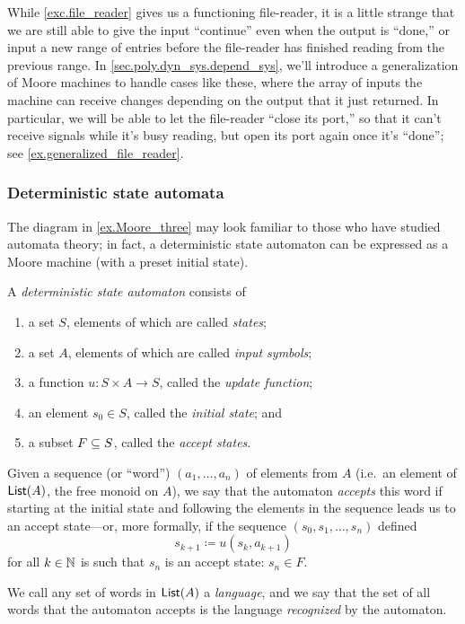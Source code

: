 \documentclass[Book-Poly]{subfiles}
\begin{document}
While \cref{exc.file_reader} gives us a functioning file-reader, it is a little strange that we are still able to give the input ``continue'' even when the output is ``done,'' or input a new range of entries before the file-reader has finished reading from the previous range.
In \cref{sec.poly.dyn_sys.depend_sys}, we'll introduce a generalization of Moore machines to handle cases like these, where the array of inputs the machine can receive changes depending on the output that it just returned.
In particular, we will be able to let the file-reader ``close its port,'' so that it can't receive signals while it's busy reading, but open its port again once it's ``done''; see \cref{ex.generalized_file_reader}.

\subsubsection{Deterministic state automata}


The diagram in \cref{ex.Moore_three} may look familiar to those who have studied automata theory; in fact, a deterministic state automaton can be expressed as a Moore machine (with a preset initial state).

\begin{definition}\label{def.dfa}
A \emph{deterministic state automaton} consists of
\begin{enumerate}
	\item a set $S$, elements of which are called \emph{states};
	\item a set $A$, elements of which are called \emph{input symbols};
	\item a function $u\colon S\times A\to S$, called the \emph{update function};
	\item an element $s_0\in S$, called the \emph{initial state}; and
	\item a subset $F\ss S$, called the \emph{accept states}.
\end{enumerate}
Given a sequence (or ``word'') $(a_1,\ldots,a_n)$ of elements from $A$ (i.e.\ an element of $\lst(A)$, the free monoid on $A$), we say that the automaton \emph{accepts} this word if starting at the initial state and following the elements in the sequence leads us to an accept state---or, more formally, if the sequence $(s_0,s_1,\ldots,s_n)$ defined
\[
    s_{k+1}\coloneqq u(s_k,a_{k+1})
\]
for all $k\in\nn$ is such that $s_n$ is an accept state: $s_n\in F$.

We call any set of words in $\lst(A)$ a \emph{language}, and we say that the set of all words that the automaton accepts is the language \emph{recognized} by the automaton.
\end{definition}
\end{document}
